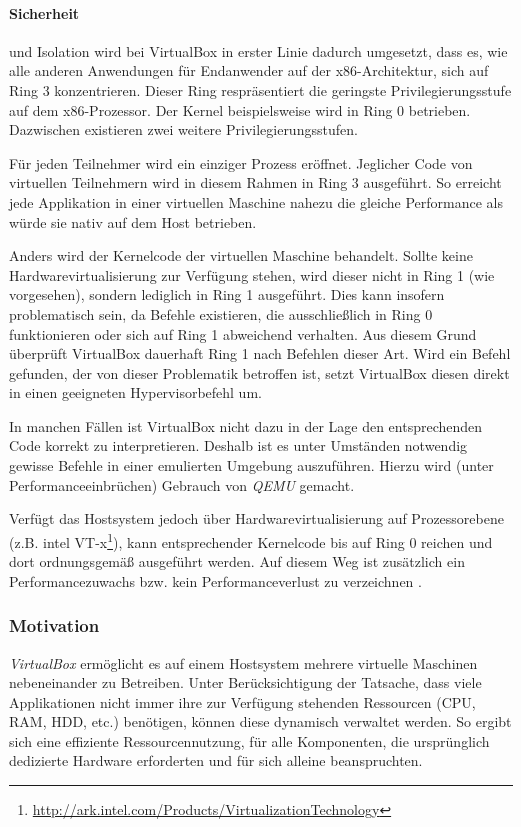 \paragraph{Sicherheit} und Isolation wird bei VirtualBox in erster Linie dadurch umgesetzt, dass
es, wie alle anderen Anwendungen für Endanwender auf der x86-Architektur, sich auf Ring 3 konzentrieren.
Dieser Ring respräsentiert die geringste Privilegierungsstufe auf dem x86-Prozessor. Der Kernel
beispielsweise wird in Ring 0 betrieben. Dazwischen existieren zwei weitere Privilegierungsstufen.

Für jeden Teilnehmer wird ein einziger Prozess eröffnet. Jeglicher Code von virtuellen Teilnehmern
wird in diesem Rahmen in Ring 3 ausgeführt. So erreicht jede Applikation in einer virtuellen Maschine
nahezu die gleiche Performance als würde sie nativ auf dem Host betrieben.

Anders wird der Kernelcode der virtuellen Maschine behandelt. Sollte keine Hardwarevirtualisierung
zur Verfügung stehen, wird dieser nicht in Ring 1 (wie vorgesehen), sondern lediglich in Ring 1
ausgeführt. Dies kann insofern problematisch sein, da Befehle existieren, die ausschließlich
in Ring 0 funktionieren oder sich auf Ring 1 abweichend verhalten. Aus diesem Grund überprüft
VirtualBox dauerhaft Ring 1 nach Befehlen dieser Art. Wird ein Befehl gefunden, der von dieser
Problematik betroffen ist, setzt VirtualBox diesen direkt in einen geeigneten Hypervisorbefehl
um.

In manchen Fällen ist VirtualBox nicht dazu in der Lage den entsprechenden Code korrekt zu
interpretieren. Deshalb ist es unter Umständen notwendig gewisse Befehle in einer
emulierten Umgebung auszuführen. Hierzu wird (unter Performanceeinbrüchen) Gebrauch von
\textit{QEMU} gemacht. 

Verfügt das Hostsystem jedoch über Hardwarevirtualisierung auf Prozessorebene 
(z.B. intel VT-x\footnote{\url{http://ark.intel.com/Products/VirtualizationTechnology}}),
kann entsprechender Kernelcode bis auf Ring 0 reichen und dort ordnungsgemäß ausgeführt werden.
Auf diesem Weg ist zusätzlich
ein Performancezuwachs bzw. kein Performanceverlust zu verzeichnen \cite{victor10}.

\subsubsection{Motivation}
\textit{VirtualBox} ermöglicht es auf einem Hostsystem mehrere virtuelle Maschinen nebeneinander
zu Betreiben. Unter Berücksichtigung der Tatsache, dass viele Applikationen nicht immer ihre
zur Verfügung stehenden Ressourcen (CPU, RAM, HDD, etc.) benötigen, können diese dynamisch verwaltet
werden. So ergibt sich eine effiziente Ressourcennutzung, für alle Komponenten, die ursprünglich
dedizierte Hardware erforderten und für sich alleine beanspruchten.

